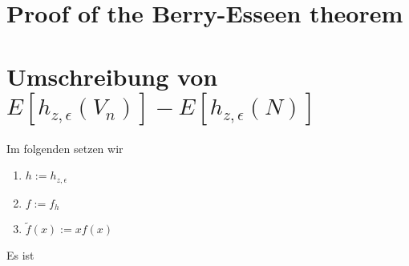 \section{Proof of the Berry-Esseen theorem}



\newpage

\section{Umschreibung von $E[h_{z,\epsilon}(V_n)]-E[h_{z,\epsilon}(N)]$}

Im folgenden setzen wir

\begin{enumerate}
\item $h:=h_{z,\epsilon}$
\item $f:=f_h$
\item $\tilde f(x):=xf(x)$
\end{enumerate}

\noindent Es ist

